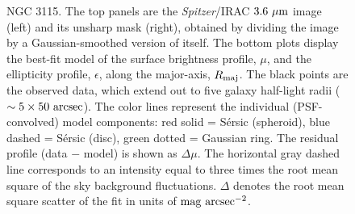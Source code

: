 \documentclass[useAMS,usenatbib,article]{mnras}
\begin{document}
\begin{figure}
\begin{center}
\caption{NGC 3115. 
The top panels are the \emph{Spitzer}/IRAC $3.6~\rm \mu m$ image (left) and its unsharp mask (right), 
obtained by dividing the image by a Gaussian-smoothed version of itself. 
The bottom plots display the best-fit model of the surface brightness profile, $\mu$, 
and the ellipticity profile, $\epsilon$, 
along the major-axis, $R_{\rm maj}$. 
The black points are the observed data, which extend out to five galaxy half-light radii ($\sim 5 \times 50~\rm arcsec$). 
The color lines represent the individual (PSF-convolved) model components: 
red solid = S\'ersic (spheroid), blue dashed = S\'ersic (disc), green dotted = Gaussian ring. 
The residual profile (data $-$ model) is shown as $\Delta \mu$. 
The horizontal gray dashed line corresponds to an intensity equal to three times the root mean square of the sky background fluctuations. 
$\Delta$ denotes the root mean square scatter of the fit in units of $\rm mag~arcsec^{-2}$. }
\label{fig:n3115}
\end{center}
\end{figure}
\end{document}
